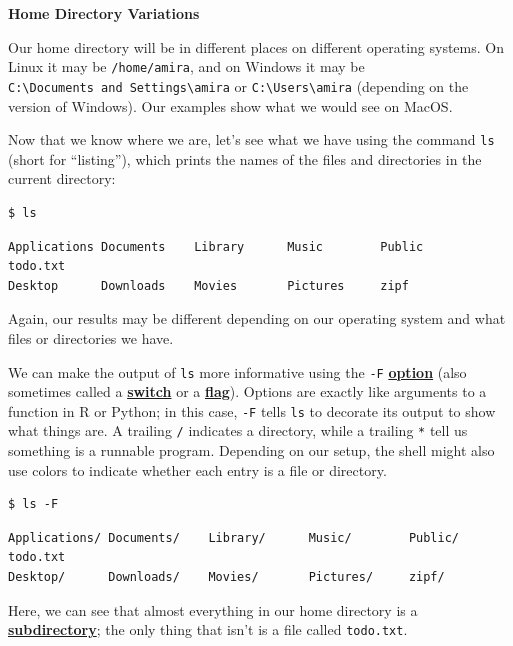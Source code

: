 \documentclass[
]{krantz}
\renewenvironment{quote}{\begin{VF}}{\end{VF}}
\newcommand{\gref}[2]{\hyperlink{#2}{\textbf{#1}}}
\begin{document}
\begin{quote}
\textbf{Home Directory Variations}

Our home directory will be in different places on different operating systems.
On Linux it may be \texttt{/home/amira},
and on Windows it may be \texttt{C:\textbackslash{}Documents\ and\ Settings\textbackslash{}amira} or \texttt{C:\textbackslash{}Users\textbackslash{}amira}
(depending on the version of Windows).
Our examples show what we would see on MacOS.
\end{quote}

Now that we know where we are,
let's see what we have using the command \texttt{ls}
(short for ``listing''),
which prints the names of the files and directories in the current directory:

\begin{verbatim}
$ ls
\end{verbatim}

\begin{verbatim}
Applications Documents    Library      Music        Public         todo.txt
Desktop      Downloads    Movies       Pictures     zipf
\end{verbatim}

Again,
our results may be different depending on our operating system
and what files or directories we have.

We can make the output of \texttt{ls} more informative using the \texttt{-F} \gref{option}{command\_line\_option}
(also sometimes called a \gref{switch}{command\_line\_switch} or a \gref{flag}{command\_line\_flag}).
Options are exactly like arguments to a function in R or Python;
in this case,
\texttt{-F} tells \texttt{ls} to decorate its output to show what things are.
A trailing \texttt{/} indicates a directory,
while a trailing \texttt{*} tell us something is a runnable program.
Depending on our setup,
the shell might also use colors to indicate whether each entry is a file or directory.

\begin{verbatim}
$ ls -F
\end{verbatim}

\begin{verbatim}
Applications/ Documents/    Library/      Music/        Public/        todo.txt
Desktop/      Downloads/    Movies/       Pictures/     zipf/
\end{verbatim}

Here,
we can see that almost everything in our home directory is a \gref{subdirectory}{subdirectory};
the only thing that isn't is a file called \texttt{todo.txt}.
\end{document}
